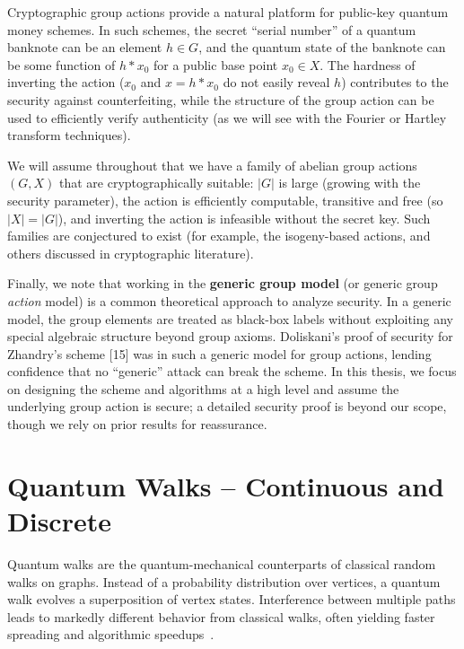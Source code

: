 \documentclass[12pt]{report}
\begin{document}
Cryptographic group actions provide a natural platform for public-key quantum money schemes. In such schemes, the secret “serial number” of a quantum banknote can be an element $h \in G$, and the quantum state of the banknote can be some function of $h*x_0$ for a public base point $x_0 \in X$. The hardness of inverting the action ($x_0$ and $x = h*x_0$ do not easily reveal $h$) contributes to the security against counterfeiting, while the structure of the group action can be used to efficiently verify authenticity (as we will see with the Fourier or Hartley transform techniques).

We will assume throughout that we have a family of abelian group actions $(G,X)$ that are cryptographically suitable: $|G|$ is large (growing with the security parameter), the action is efficiently computable, transitive and free (so $|X|=|G|$), and inverting the action is infeasible without the secret key. Such families are conjectured to exist (for example, the isogeny-based actions, and others discussed in cryptographic literature). 

Finally, we note that working in the \textbf{generic group model} (or generic group \emph{action} model) is a common theoretical approach to analyze security. In a generic model, the group elements are treated as black-box labels without exploiting any special algebraic structure beyond group axioms. Doliskani’s proof of security for Zhandry’s scheme [15] was in such a generic model for group actions, lending confidence that no “generic” attack can break the scheme. In this thesis, we focus on designing the scheme and algorithms at a high level and assume the underlying group action is secure; a detailed security proof is beyond our scope, though we rely on prior results for reassurance.





\chapter{Quantum Walks -- Continuous and Discrete}

Quantum walks are the quantum-mechanical counterparts of classical random walks on graphs. Instead of a probability distribution over vertices, a quantum walk evolves a superposition of vertex states. Interference between multiple paths leads to markedly different behavior from classical walks, often yielding faster spreading and algorithmic speedups~\cite{physics_stackexchange}.
\end{document}

